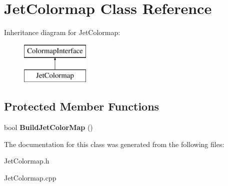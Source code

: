 \hypertarget{classJetColormap}{
\section{JetColormap Class Reference}
\label{classJetColormap}
}
Inheritance diagram for JetColormap:\begin{figure}[H]
\begin{center}
\leavevmode
\includegraphics[height=2.000000cm]{classJetColormap}
\end{center}
\end{figure}
\subsection*{Protected Member Functions}
\begin{DoxyCompactItemize}
\item 
\hypertarget{classJetColormap_adb6098abf5cd454a5b2bd62ff8df2e6b}{
bool {\bfseries BuildJetColorMap} ()}
\label{classJetColormap_adb6098abf5cd454a5b2bd62ff8df2e6b}

\end{DoxyCompactItemize}


The documentation for this class was generated from the following files:\begin{DoxyCompactItemize}
\item 
JetColormap.h\item 
JetColormap.cpp\end{DoxyCompactItemize}
